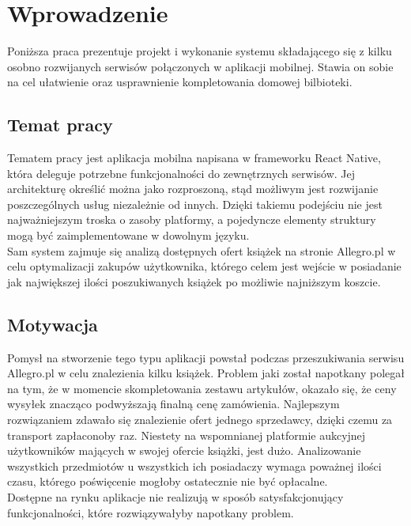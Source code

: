 \chapter{Wprowadzenie}
\label{cha:wprowadzenie}

Poniższa praca prezentuje projekt i wykonanie systemu składającego się z kilku osobno rozwijanych serwisów połączonych w aplikacji mobilnej. Stawia on sobie na cel ułatwienie oraz usprawnienie kompletowania domowej bilbioteki.

\section{Temat pracy}
\label{sec:tematPracy}

Tematem pracy jest aplikacja mobilna napisana w frameworku React Native, która deleguje potrzebne funkcjonalności do zewnętrznych serwisów. Jej architekturę określić można jako rozproszoną, stąd możliwym jest rozwijanie poszczególnych usług niezależnie od innych. Dzięki takiemu podejściu nie jest najważniejszym troska o zasoby platformy, a pojedyncze elementy struktury mogą być zaimplementowane w dowolnym języku.\\
Sam system zajmuje się analizą dostępnych ofert książek na stronie Allegro.pl w celu optymalizacji zakupów użytkownika, którego celem jest wejście w posiadanie jak największej ilości poszukiwanych książek po możliwie najniższym koszcie.



\section{Motywacja}
\label{sec:motywacja}
Pomysł na stworzenie tego typu aplikacji powstał podczas przeszukiwania serwisu Allegro.pl w celu znalezienia kilku książek. Problem jaki został napotkany polegał na tym, że w momencie skompletowania zestawu artykułów, okazało się, że ceny wysyłek znacząco podwyższają finalną cenę zamówienia. Najlepszym rozwiązaniem zdawało się znalezienie ofert jednego sprzedawcy, dzięki czemu za transport zapłaconoby raz. Niestety na wspomnianej platformie aukcyjnej użytkowników mających w swojej ofercie książki, jest dużo. Analizowanie wszystkich przedmiotów u wszystkich ich posiadaczy wymaga poważnej ilości czasu, którego poświęcenie mogłoby ostatecznie nie być opłacalne.\\
Dostępne na rynku aplikacje nie realizują w sposób satysfakcjonujący funkcjonalności, które rozwiązywałyby napotkany problem.

